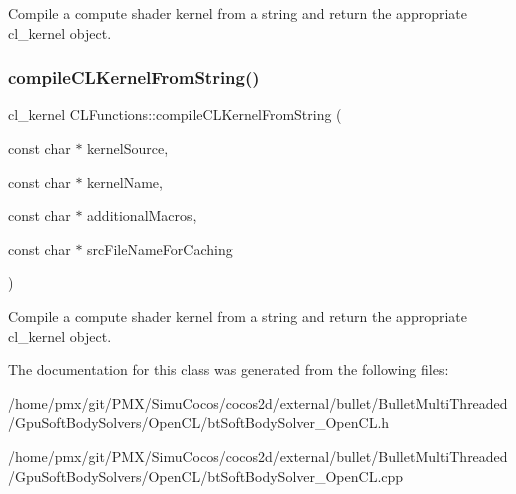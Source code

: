 Compile a compute shader kernel from a string and return the appropriate cl\+\_\+kernel object. \mbox{\label{classCLFunctions_a87f7cc3be08f51966e0bc087e7520a9f}} 
\subsubsection{\texorpdfstring{compile\+C\+L\+Kernel\+From\+String()}{compileCLKernelFromString()}\hspace{0.1cm}{\footnotesize\ttfamily [2/2]}}
{\footnotesize\ttfamily cl\+\_\+kernel C\+L\+Functions\+::compile\+C\+L\+Kernel\+From\+String (\begin{DoxyParamCaption}\item[{const char $\ast$}]{kernel\+Source,  }\item[{const char $\ast$}]{kernel\+Name,  }\item[{const char $\ast$}]{additional\+Macros,  }\item[{const char $\ast$}]{src\+File\+Name\+For\+Caching }\end{DoxyParamCaption})\hspace{0.3cm}{\ttfamily [virtual]}}

Compile a compute shader kernel from a string and return the appropriate cl\+\_\+kernel object. 

The documentation for this class was generated from the following files\+:\begin{DoxyCompactItemize}
\item 
/home/pmx/git/\+P\+M\+X/\+Simu\+Cocos/cocos2d/external/bullet/\+Bullet\+Multi\+Threaded/\+Gpu\+Soft\+Body\+Solvers/\+Open\+C\+L/bt\+Soft\+Body\+Solver\+\_\+\+Open\+C\+L.\+h\item 
/home/pmx/git/\+P\+M\+X/\+Simu\+Cocos/cocos2d/external/bullet/\+Bullet\+Multi\+Threaded/\+Gpu\+Soft\+Body\+Solvers/\+Open\+C\+L/bt\+Soft\+Body\+Solver\+\_\+\+Open\+C\+L.\+cpp\end{DoxyCompactItemize}
